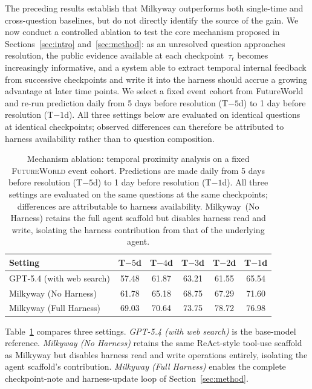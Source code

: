 The preceding results establish that Milkyway outperforms both single-time and cross-question baselines, but do not directly identify the source of the gain. We now conduct a controlled ablation to test the core mechanism proposed in Sections~\ref{sec:intro} and~\ref{sec:method}: as an unresolved question approaches resolution, the public evidence available at each checkpoint~$\tau_t$ becomes increasingly informative, and a system able to extract temporal internal feedback from successive checkpoints and write it into the harness should accrue a growing advantage at later time points. We select a fixed event cohort from FutureWorld and re-run prediction daily from 5 days before resolution (T$-5$d) to 1 day before resolution (T$-1$d). All three settings below are evaluated on identical questions at identical checkpoints; observed differences can therefore be attributed to harness availability rather than to question composition.

\begin{table}[t]
\centering
\small
\setlength{\tabcolsep}{4.0pt}
\caption{Mechanism ablation: temporal proximity analysis on a fixed \textsc{FutureWorld} event cohort. Predictions are made daily from 5 days before resolution (T$-5$d) to 1 day before resolution (T$-1$d). All three settings are evaluated on the same questions at the same checkpoints; differences are attributable to harness availability. Milkyway~(No Harness) retains the full agent scaffold but disables harness read and write, isolating the harness contribution from that of the underlying agent.}
\label{tab:temporal_proximity}
\begin{tabular}{l ccccc}
\toprule
Setting & T$-5$d & T$-4$d & T$-3$d & T$-2$d & T$-1$d \\
\midrule
GPT-5.4 (with web search) & 57.48 & 61.87 & 63.21 & 61.55 & 65.54 \\
Milkyway (No Harness)     & 61.78 & 65.18 & 68.75 & 67.29 & 71.60 \\
Milkyway (Full Harness)   & 69.03 & 70.64 & 73.75 & 78.72 & 76.98 \\
\bottomrule
\end{tabular}
\end{table}

Table~\ref{tab:temporal_proximity} compares three settings. \textit{GPT-5.4 (with web search)} is the base-model reference. \textit{Milkyway (No Harness)} retains the same ReAct-style tool-use scaffold as Milkyway but disables harness read and write operations entirely, isolating the agent scaffold's contribution. \textit{Milkyway (Full Harness)} enables the complete checkpoint-note and harness-update loop of Section~\ref{sec:method}.


